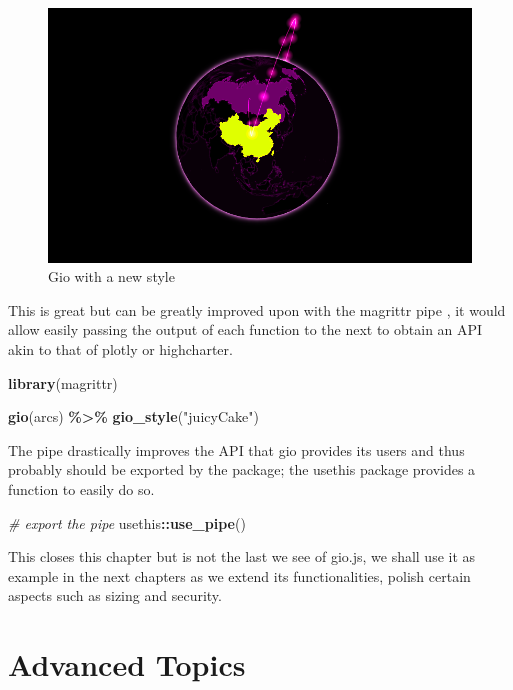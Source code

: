 \documentclass[
]{krantz}
\makeatletter
\newenvironment{Shaded}{\begin{snugshade}}{\end{snugshade}}
\newcommand{\CommentTok}[1]{\textcolor[rgb]{0.37,0.37,0.37}{\textit{#1}}}
\newcommand{\KeywordTok}[1]{\textcolor[rgb]{0.27,0.27,0.27}{\textbf{#1}}}
\newcommand{\NormalTok}[1]{#1}
\newcommand{\OperatorTok}[1]{\textcolor[rgb]{0.43,0.43,0.43}{\textbf{#1}}}
\newcommand{\StringTok}[1]{\textcolor[rgb]{0.5,0.5,0.5}{#1}}
\newenvironment{kframe}{%
\medskip{}
\setlength{\fboxsep}{.8em}
 \def\at@end@of@kframe{}%
 \ifinner\ifhmode%
  \def\at@end@of@kframe{\end{minipage}}%
  \begin{minipage}{\columnwidth}%
 \fi\fi%
 \def\FrameCommand##1{\hskip\@totalleftmargin \hskip-\fboxsep
 \colorbox{shadecolor}{##1}\hskip-\fboxsep
     \hskip-\linewidth \hskip-\@totalleftmargin \hskip\columnwidth}%
 \MakeFramed {\advance\hsize-\width
   \@totalleftmargin\z@ \linewidth\hsize
   \@setminipage}}%
 {\par\unskip\endMakeFramed%
 \at@end@of@kframe}
\renewenvironment{Shaded}{\begin{kframe}}{\end{kframe}}
\makeatother
\begin{document}
\begin{figure}
\centering
\includegraphics{images/gio-style.png}
\caption{Gio with a new style}
\end{figure}

This is great but can be greatly improved upon with the magrittr pipe \citep{R-magrittr}, it would allow easily passing the output of each function to the next to obtain an API akin to that of plotly or highcharter.

\begin{Shaded}
\begin{Highlighting}[]
\KeywordTok{library}\NormalTok{(magrittr)}

\KeywordTok{gio}\NormalTok{(arcs) }\OperatorTok{\%>\%}\StringTok{ }
\StringTok{  }\KeywordTok{gio\_style}\NormalTok{(}\StringTok{"juicyCake"}\NormalTok{)}
\end{Highlighting}
\end{Shaded}

The pipe drastically improves the API that gio provides its users and thus probably should be exported by the package; the usethis package provides a function to easily do so.

\begin{Shaded}
\begin{Highlighting}[]
\CommentTok{\# export the pipe}
\NormalTok{usethis}\OperatorTok{::}\KeywordTok{use\_pipe}\NormalTok{()}
\end{Highlighting}
\end{Shaded}

This closes this chapter but is not the last we see of gio.js, we shall use it as example in the next chapters as we extend its functionalities, polish certain aspects such as sizing and security.

\hypertarget{widgets-adv}{%
\chapter{Advanced Topics}\label{widgets-adv}}
\end{document}

